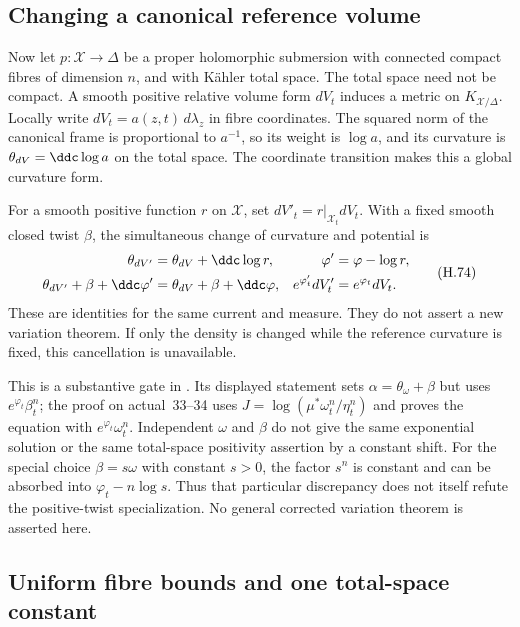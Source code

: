 \subsection{Changing a canonical reference volume}
\label{sec:appH-KE-reference-volume}

Now let $p:\mathcal X\to\Delta$ be a proper holomorphic submersion
with connected compact fibres of dimension $n$, and with K\"ahler
total space. The total space need not be compact. A smooth positive
relative volume form $dV_t$ induces a metric on $K_{\mathcal X/\Delta}$.
Locally write $dV_t=a(z,t)\,d\lambda_z$ in fibre coordinates.
The squared norm of the canonical frame is proportional to $a^{-1}$,
so its weight is $\log a$, and its curvature is
$\theta_{dV}=\ddc\log a$ on the total space. The coordinate
transition makes this a global curvature form.

For a smooth positive function $r$ on $\mathcal X$, set
$dV'_t=r|_{\mathcal X_t}dV_t$. With a fixed smooth closed twist
$\beta$, the simultaneous change of curvature and potential is
\begin{equation*}
\begin{aligned}
 \theta_{dV'}&=\theta_{dV}+\ddc\log r,
 &\varphi'&=\varphi-\log r,\\
 \theta_{dV'}+\beta+\ddc\varphi'
   &=\theta_{dV}+\beta+\ddc\varphi,
 &e^{\varphi'_t}dV'_t&=e^{\varphi_t}dV_t.
\end{aligned}
\tag{H.74}\label{eq:appH-KE-volume-covariance}
\end{equation*}
These are identities for the same current and measure. They do not
assert a new variation theorem. If only the density is changed while
the reference curvature is fixed, this cancellation is unavailable.

This is a substantive gate in \cite[Theorem~1.3, actual p.~5]{LPWZ26KEV1}.
Its displayed statement sets $\alpha=\theta_\omega+\beta$ but
uses $e^{\varphi_t}\beta_t^n$; the proof on actual~33--34 uses
$J=\log(\mu^*\omega_t^n/\eta_t^n)$ and proves the equation with
$e^{\varphi_t}\omega_t^n$. Independent $\omega$ and $\beta$
do not give the same exponential solution or the same total-space
positivity assertion by a constant shift. For the special choice
$\beta=s\omega$ with constant $s>0$, the factor $s^n$ is constant
and can be absorbed into $\varphi_t-n\log s$. Thus that particular
discrepancy does not itself refute the positive-twist specialization.
No general corrected variation theorem is asserted here.

\subsection{Uniform fibre bounds and one total-space constant}
\label{sec:appH-KE-uniform-fibre-bound}

